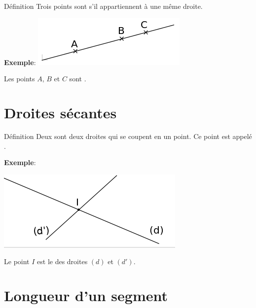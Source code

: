 \documentclass[12pt,a4paper]{article}
\begin{document}
\begin{minipage}{0.4\textwidth}
\begin{definition}{Définition}
Trois points sont  s'il appartiennent à une même droite.
\end{definition}
\end{minipage}
\begin{minipage}{0.25\textwidth}
\textbf{Exemple}:
\includegraphics[scale=0.6]{img/alignement.png} 
\end{minipage}
\begin{minipage}{0.4\textwidth}
Les points $A$, $B$ et $C$ sont .
\end{minipage}

\section{Droites sécantes}

\begin{definition}{Définition}
Deux  sont deux droites qui se coupent en un point. Ce point est appelé .
\end{definition}

\textbf{Exemple}:\\
\begin{center}
\begin{minipage}{0.4\textwidth}
\includegraphics[scale=0.8]{img/secantes.png}
\end{minipage}
\begin{minipage}{0.4\textwidth}
Le point $I$ est le  des droites $(d)$ et $(d')$.
\end{minipage}
\end{center}

\section{Longueur d'un segment}
\end{document}

